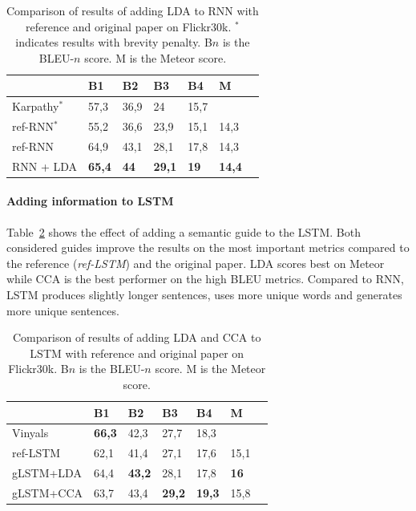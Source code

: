 \documentclass[twoside,twocolumn]{article}
\begin{document}
\begin{table}
    \centering
    \begin{tabular}{lllllll}
        & B1 & B2 & B3 & B4 & M \\ \hline
        Karpathy$^*$~\cite{Karpathy2015}    & 57,3   & 36,9   & 24     & 15,7   & ~           \\    
        ref-RNN$^*$     & 55,2   & 36,6   & 23,9   & 15,1   & 14,3          \\
        ref-RNN          & 64,9  & 43,1     & 28,1   & 17,8   & 14,3          \\
        RNN + LDA         & \textbf{65,4}   & \textbf{44}     & \textbf{29,1}   & \textbf{19}     & \textbf{14,4}          \\\hline
    \end{tabular}
    \caption{Comparison of results of adding LDA to RNN with reference and original paper on Flickr30k. $^{*}$ indicates results with brevity penalty. B$n$ is the BLEU-$n$ score. M is the Meteor score.}
    \label{table:results_rnn}
\end{table}

\paragraph{Adding information to LSTM}
Table~\ref{table:results_lstm} shows the effect of adding a semantic guide to the LSTM. Both considered guides improve the results on the most important metrics compared to the reference (\emph{ref-LSTM}) and the original paper. LDA scores best on Meteor while CCA is the best performer on the high BLEU metrics. Compared to RNN, LSTM produces slightly longer sentences, uses more unique words and generates more unique sentences.
\begin{table}
    \centering
    \begin{tabular}{lllllll}
        & B1 & B2 & B3 & B4 & M \\ \hline
            Vinyals~\cite{Google}      & \textbf{66,3}   & 42,3   & 27,7   & 18,3   & ~     \\ 
            ref-LSTM         & 62,1   & 41,4   & 27,1   & 17,6   & 15,1  \\
            gLSTM+LDA         & 64,4   & \textbf{43,2}   & 28,1   & 17,8   & \textbf{16}  \\
            gLSTM+CCA         & 63,7   & 43,4   & \textbf{29,2}   &\textbf{19,3}   & 15,8  \\ \hline
    \end{tabular}
    \caption{Comparison of results of adding LDA and CCA to LSTM with reference and original paper on Flickr30k. B$n$ is the BLEU-$n$ score. M is the Meteor score.}
    \label{table:results_lstm}
\end{table}
\end{document}
